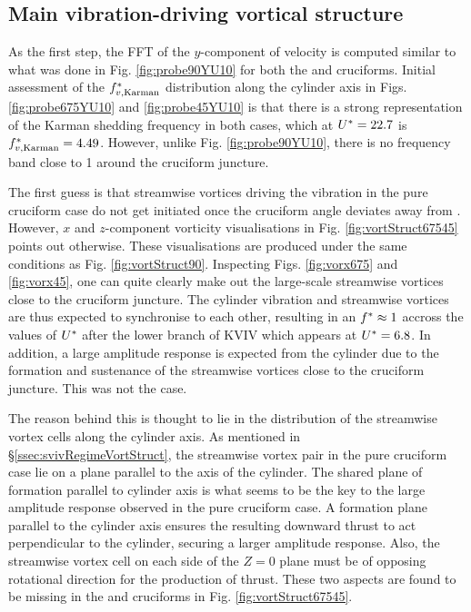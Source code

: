 \documentclass[oneside]{utmthesis}
\begin{document}
\subsection{Main vibration-driving vortical structure}\label{ssec:transitionalRegimeVortStruct}
As the first step, the FFT of the $y$-component of velocity is computed similar to what was done in Fig. \ref{fig:probe90YU10} for both the \angfo{} and \angth{} cruciforms. Initial assessment of the $f^{*}_{v,\text{Karman}}$ distribution along the cylinder axis in Figs. \ref{fig:probe675YU10} and \ref{fig:probe45YU10} is that there is a strong representation of the Karman shedding frequency in both cases, which at $U^{*} = 22.7$ is $f^{*}_{v,\text{Karman}} = 4.49$. However, unlike Fig. \ref{fig:probe90YU10}, there is no frequency band close to 1 around the cruciform juncture.

The first guess is that streamwise vortices driving the vibration in the pure cruciform case do not get initiated once the cruciform angle deviates away from \angfi{}. However, $x$ and $z$-component vorticity visualisations in Fig. \ref{fig:vortStruct67545} points out otherwise. These visualisations are produced under the same conditions as Fig. \ref{fig:vortStruct90}. Inspecting Figs. \ref{fig:vorx675} and \ref{fig:vorx45}, one can quite clearly make out the large-scale streamwise vortices close to the cruciform juncture. The cylinder vibration and streamwise vortices are thus expected to synchronise to each other, resulting in an $f^{*} \approx 1$ accross the values of $U^{*}$ after the lower branch of KVIV which appears at $U^{*} = 6.8$. In addition, a large amplitude response is expected from the cylinder due to the formation and sustenance of the streamwise vortices close to the cruciform juncture. This was not the case.

The reason behind this is thought to lie in the distribution of the streamwise vortex cells along the cylinder axis. As mentioned in \S\ref{ssec:svivRegimeVortStruct}, the streamwise vortex pair in the pure cruciform case lie on a plane parallel to the axis of the cylinder. The shared plane of formation parallel to cylinder axis is what seems to be the key to the large amplitude response observed in the pure cruciform case. A formation plane parallel to the cylinder axis ensures the resulting downward thrust to act perpendicular to the cylinder, securing a larger amplitude response. Also, the streamwise vortex cell on each side of the $Z = 0$ plane must be of opposing rotational direction for the production of thrust. These two aspects are found to be missing in the \angfo{} and \angth{} cruciforms in Fig. \ref{fig:vortStruct67545}.
\end{document}
